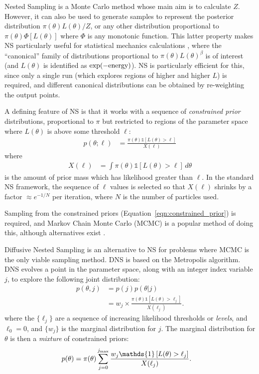 \documentclass[article]{jss}
\begin{document}
Nested Sampling \citep[NS;][]{skilling} is a Monte Carlo method whose main
aim is to calculate $Z$. However, it can also be used to generate samples
to represent the posterior distribution $\pi(\theta)L(\theta)/Z$, or
any other distribution proportional to
$\pi(\theta)\Phi\left[L(\theta)\right]$ where $\Phi$ is any monotonic function.
This latter property makes NS particularly useful for statistical mechanics
calculations \citep{2009arXiv0906.3544P, 2015arXiv150303404B}, where the
``canonical'' family of distributions proportional to
$\pi(\theta)L(\theta)^\beta$ is of interest (and $L(\theta)$ is identified as
$\exp(-\textnormal{energy})$). NS is particularly efficient for this, since
only a single run (which explores regions of higher and higher $L$)
is required, and different canonical
distributions can be obtained by re-weighting the output points.

A defining feature of NS is that it works with a sequence of
{\em constrained prior} distributions, proportional to $\pi$ but
restricted to regions of the parameter space where $L(\theta)$
is above some threshold $\ell$:
\begin{align}
p(\theta; \ell) &=
\frac{\pi(\theta)\mathds{1}\left[L(\theta) > \ell\right]}{X(\ell)}
\label{eqn:constrained_prior}
\end{align}
where
\begin{align}
X(\ell) &= \int \pi(\theta) \mathds{1}\left[L(\theta) > \ell\right] \, d\theta
\end{align}
is the amount of prior mass which has likelihood greater than $\ell$.
In the standard NS framework, the sequence of $\ell$ values is selected
so that $X(\ell)$ shrinks by a factor $\approx e^{-1/N}$ per iteration, where
$N$ is the number of particles used.

Sampling from the constrained priors (Equation~\ref{eqn:constrained_prior})
is required, and Markov Chain Monte Carlo (MCMC) is a popular method of doing
this, although alternatives exist \citep[e.g.][]{multinest, 2015MNRAS.453.4384H}.

Diffusive Nested Sampling \citep[DNS][]{dnest} is an alternative to NS for
problems where MCMC is the only viable sampling method. DNS is based on the
Metropolis algorithm. DNS evolves a point in the parameter space, along with
an integer index variable $j$,
to explore the following joint distribution:
\begin{align}
p(\theta, j) &= p(j)p(\theta | j)\\
&= w_j \times
\frac{\pi(\theta)\mathds{1}\left[L(\theta) > \ell_j\right]}{X(\ell_j)}.
\label{eqn:target_distribution}
\end{align}
where the $\{\ell_j\}$ are a sequence of increasing likelihood thresholds
or {\em levels}, and
$\ell_0 = 0$, and $\{w_j\}$ is the marginal distribution for $j$.
The marginal distribution for $\theta$ is then a {\em mixture} of
constrained priors:
\begin{align}
p(\theta) &=
\pi(\theta)\sum_{j=0}^{j_{\rm max}}
\frac{w_j\mathds{1}\left[L(\theta) > \ell_j\right]}{X(\ell_j)}.
\label{eqn:mixture_of_constrained_priors}
\end{align}
\end{document}
